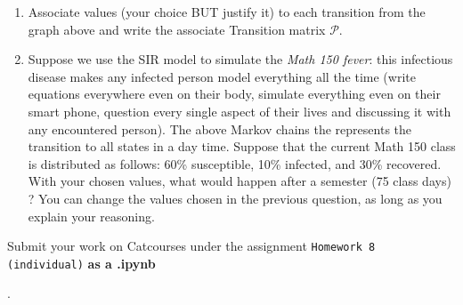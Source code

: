 \documentclass[11pt]{article}
\begin{document}
\begin{enumerate}
\begin{enumerate}
\item Associate values (your choice BUT justify it) to each transition from the graph above and write the associate Transition matrix $\mathcal{P}$. 
\item Suppose we use the SIR model to simulate the \textit{Math 150 fever}: this infectious disease makes any infected person model everything all the time (write equations everywhere even on their body, simulate everything even on their smart phone, question every single aspect of their lives and discussing it with any encountered person). The above Markov chains the represents the transition to all states in a day time. Suppose that the current Math 150 class is distributed as follows: 60\% susceptible, 10\% infected, and 30\% recovered. With your chosen values, what would happen after a semester (75 class days) ? You can change the values chosen in the previous question, as long as you explain your reasoning.
\end{enumerate}
{\item Submit your work on Catcourses under the assignment \texttt{Homework 8 (individual)} \textbf{as a .ipynb}}. 
\end{enumerate}


%
%  
% 
   
\end{document}

